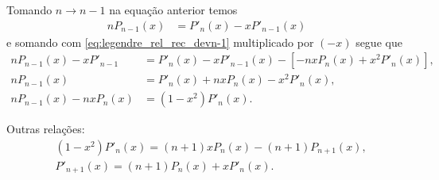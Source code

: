 \documentclass[a4paper,12pt, leqno, answers]{exam}
\begin{document}
\begin{questions}
\begin{solution}
        Tomando $n \to n - 1$ na equa\c{c}\~{a}o anterior temos
        \begin{align*}
            n P_{n - 1}(x) &= P'_{n}(x) - x P'_{n - 1}(x)
        \end{align*}
        e somando com \eqref{eq:legendre_rel_rec_devn-1} multiplicado por $(-x)$ segue que
        \begin{align*}
            n P_{n - 1}(x) - x P'_{n - 1} &= P'_n(x) - x P'_{n - 1}(x) - \left[ -n x P_n(x) + x^2 P'_n(x) \right], \\
            n P_{n - 1}(x) &= P'_n(x) + n x P_n(x) - x^2 P'_n(x), \\
            n P_{n - 1}(x) - n x P_n(x) &= (1 - x^2) P'_n(x).
        \end{align*}

        Outras rela\c{c}\~{o}es:
        \begin{align*}
            & (1 - x^2) P'_n(x) = (n + 1) x P_n(x) - (n + 1) P_{n + 1}(x), \\
            & P'_{n + 1}(x) = (n + 1) P_n(x) + x P'_n(x).
        \end{align*}
    \end{solution}


\end{questions}
\end{document}
